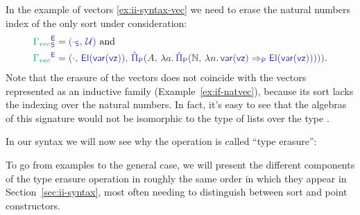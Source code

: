 \begin{example}[Vectors]\label{ex:red-e-vec}
In the example of vectors \ref{ex:ii-syntax-vec} we need to erase the natural numbers
index of the only sort under consideration:
\begin{align*}
\tqm{\grm{\Gamma_{vec}}^\EE_\Sc}
 &= \tqm{(\cdot_\Sc,\, \UU)} \text{ and} \\
\tqm{\grm{\Gamma_{vec}}^\EE}
  &= \tqm{(\cdot,\, \El(\var(\vz)),\, 
    \ExtPiP{A}{\blm{\lambda a.\,}\ExtPiP{\N}{\blm{\lambda n.\,}
    \var(\vz) \Rightarrow_\Pc \El(\var(\vz))}})} \text{.}
\end{align*}
Note that the erasure of the vectors does not coincide with the vectors represented
as an inductive family (Example~\ref{ex:if-natvec}), because its sort lacks the
indexing over the natural numbers.
In fact, it's easy to see that the algebras of this signature would not be isomorphic
to the type of lists over the type .
\end{example}

\begin{example}
In our syntax we will now see why the operation is called ``type erasure'':
\end{example}

To go from examples to the general case, we will present the different components
of the type erasure operation in roughly the same order in which they appear in
Section~\ref{sec:ii-syntax}, most often needing to distinguish between sort
and point constructors.

